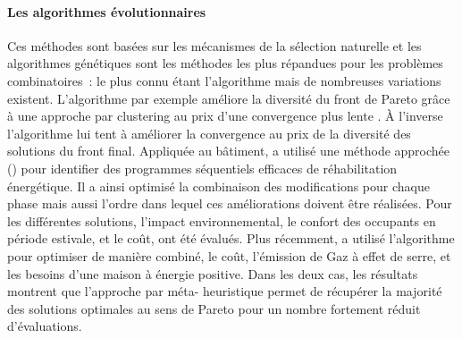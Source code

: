 \paragraph{Les algorithmes évolutionnaires} %
\label{par:les_algorithmes_evolutionnaires}
%
%
Ces méthodes sont basées sur les mécanismes de la sélection naturelle et les algorithmes
génétiques sont les méthodes les plus répandues pour les problèmes combinatoires~:
le plus connu étant l’algorithme 
\parencite{Deb2002182} mais de nombreuses variations existent. L’algorithme
 par exemple améliore la diversité du front de Pareto grâce à une approche
par clustering au prix d’une convergence plus lente \parencite{Zitzler2001}. À
l’inverse l’algorithme  lui tent à améliorer la convergence au prix
de la diversité des solutions du front final. Appliquée au bâtiment,
\textcite{Rivallain2013} a utilisé une méthode approchée () pour identifier
des programmes séquentiels efficaces de réhabilitation énergétique. Il a ainsi
optimisé la combinaison des modifications pour chaque phase mais aussi l’ordre
dans lequel ces améliorations doivent être réalisées. Pour les différentes
solutions, l’impact environnemental, le confort des occupants en période
estivale, et le coût, ont été évalués. Plus récemment, \textcite{Recht2016} a
utilisé l’algorithme  pour optimiser de manière combiné, le coût,
l’émission de Gaz à effet de serre, et les besoins d’une maison à énergie
positive. Dans les deux cas, les résultats montrent que l’approche par méta-
heuristique permet de récupérer la majorité des solutions optimales au sens de Pareto pour
un nombre fortement réduit d’évaluations.


